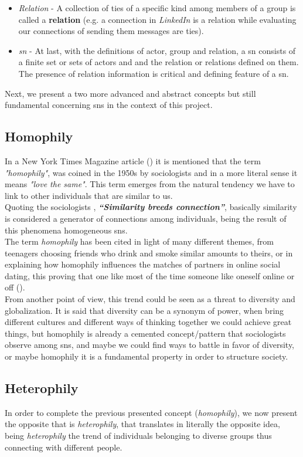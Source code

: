 \begin{itemize}
    \item \emph{Relation} - A collection of ties of a specific kind among members of a group is called a \textbf{relation} (e.g. a connection in \textit{LinkedIn} is a relation while evaluating our connections of sending them messages are ties).
    \item \emph{\gls{sn}} - At last, with the definitions of actor, group and relation, a \gls{sn} consists of a finite set or sets of actors and
    and the relation or relations defined on them. The presence of relation information is critical and defining feature of a \gls{sn}.
\end{itemize}

Next, we present a two more advanced and abstract concepts but still fundamental concerning \glspl{sn} in the context of this project.

\subsection*{Homophily}

In a New York Times Magazine article (\cite{nytmagazinehomop}) it is mentioned that the term \textit{"homophily"}, was coined in the 1950s by sociologists and in a more literal sense it means \textit{"love the same"}. This term emerges from the natural tendency we have to link to other individuals that are similar to us.\\
\indent Quoting the sociologists \cite{mcpherson2001birds}, \textbf{\textit{“Similarity breeds connection”}}, basically similarity is considered a generator of connections among individuals, being the result of this phenomena homogeneous \glspl{sn}.\\
\indent The term \textit{homophily} has been cited in light of many different themes, from teenagers choosing friends who drink and smoke similar amounts to theirs, or in explaining how homophily influences the matches of partners in online social dating, this proving that one like most of the time someone like oneself online or off (\cite{fiore2005homophily}).\\
\indent From another point of view, this trend could be seen as a threat to diversity and globalization. It is said that diversity can be a synonym of power, when bring different cultures and different ways of thinking together we could achieve great things, but homophily is already a cemented concept/pattern that sociologists observe among \glspl{sn}, and maybe we could find ways to battle in favor of diversity, or maybe homophily it is a fundamental property in order to structure society.

\subsection*{Heterophily}

In order to complete the previous presented concept (\textit{homophily}), we now present the opposite that is \textit{heterophily}, that translates in literally the opposite idea, being \textit{heterophily} the trend of individuals belonging to diverse groups thus connecting with different people.
